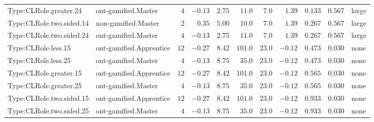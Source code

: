 \documentclass[6pt,a4paper]{article}
\begin{document}
{\begin{longtable}{llrrrrrrrrl}
Type:CLRole.greater.24&ont-gamified.Master&$ 4$&$-0.13$&$ 2.75$&$ 11.0$&$  7.0$&$ 1.39$&$0.133$&$0.567$&large\tabularnewline
Type:CLRole.two.sided.14&non-gamified.Master&$ 2$&$ 0.35$&$ 5.00$&$ 10.0$&$  7.0$&$ 1.39$&$0.267$&$0.567$&large\tabularnewline
Type:CLRole.two.sided.24&ont-gamified.Master&$ 4$&$-0.13$&$ 2.75$&$ 11.0$&$  7.0$&$ 1.39$&$0.267$&$0.567$&large\tabularnewline
Type:CLRole.less.15&ont-gamified.Apprentice&$12$&$-0.27$&$ 8.42$&$101.0$&$ 23.0$&$-0.12$&$0.473$&$0.030$&none\tabularnewline
Type:CLRole.less.25&ont-gamified.Master&$ 4$&$-0.13$&$ 8.75$&$ 35.0$&$ 23.0$&$-0.12$&$0.473$&$0.030$&none\tabularnewline
Type:CLRole.greater.15&ont-gamified.Apprentice&$12$&$-0.27$&$ 8.42$&$101.0$&$ 23.0$&$-0.12$&$0.565$&$0.030$&none\tabularnewline
Type:CLRole.greater.25&ont-gamified.Master&$ 4$&$-0.13$&$ 8.75$&$ 35.0$&$ 23.0$&$-0.12$&$0.565$&$0.030$&none\tabularnewline
\newpage
Type:CLRole.two.sided.15&ont-gamified.Apprentice&$12$&$-0.27$&$ 8.42$&$101.0$&$ 23.0$&$-0.12$&$0.933$&$0.030$&none\tabularnewline
Type:CLRole.two.sided.25&ont-gamified.Master&$ 4$&$-0.13$&$ 8.75$&$ 35.0$&$ 23.0$&$-0.12$&$0.933$&$0.030$&none\tabularnewline
\hline
\end{longtable}}
\end{document}

